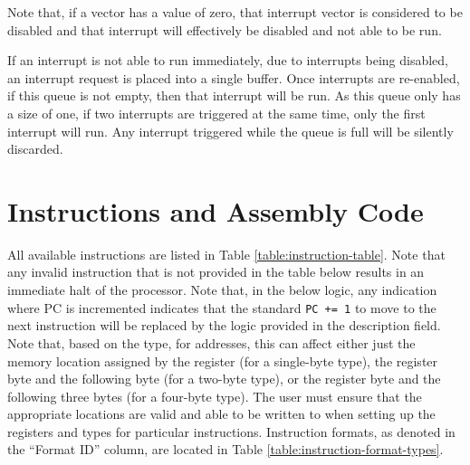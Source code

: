 \documentclass{article}
\begin{document}
Note that, if a vector has a value of zero, that interrupt vector is considered to be disabled and that interrupt will effectively be disabled and not able to be run.

If an interrupt is not able to run immediately, due to interrupts being disabled, an interrupt request is placed into a single buffer. Once interrupts are re-enabled, if this queue is not empty, then that interrupt will be run. As this queue only has a size of one, if two interrupts are triggered at the same time, only the first interrupt will run. Any interrupt triggered while the queue is full will be silently discarded.

\pagebreak

\section{Instructions and Assembly Code}
\label{sec:instructions}

All available instructions are listed in Table \ref{table:instruction-table}. Note that any invalid instruction that is not provided in the table below results in an immediate halt of the processor. Note that, in the below logic, any indication where PC is incremented indicates that the standard \texttt{PC += 1} to move to the next instruction will be replaced by the logic provided in the description field. Note that, based on the type, for addresses, this can affect either just the memory location assigned by the register (for a single-byte type), the register byte and the following byte (for a two-byte type), or the register byte and the following three bytes (for a four-byte type). The user must ensure that the appropriate locations are valid and able to be written to when setting up the registers and types for particular instructions. Instruction formats, as denoted in the ``Format ID'' column, are located in Table \ref{table:instruction-format-types}.
\end{document}
